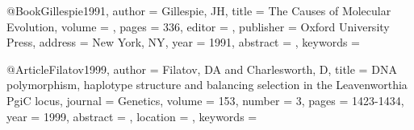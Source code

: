 @Book{Gillespie1991,
author = {Gillespie, JH}, 
title = {The Causes of Molecular Evolution}, 
volume = {}, 
pages = {336}, 
editor = {}, 
publisher = {Oxford University Press}, 
address = {New York, NY}, 
year = {1991}, 
abstract = {}, 
keywords = {}}

@Article{Filatov1999,
author = {Filatov, DA and Charlesworth, D}, 
title = {DNA polymorphism, haplotype structure and balancing selection in the Leavenworthia PgiC locus}, 
journal = {Genetics}, 
volume = {153}, 
number = {3}, 
pages = {1423-1434}, 
year = {1999}, 
abstract = {}, 
location = {}, 
keywords = {}}


